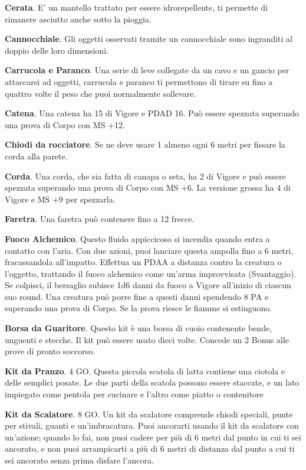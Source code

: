 \documentclass[12pt,a4paper,twoside,openany]{book}
\begin{document}
\begin{multicols}{2}
\textbf{Cerata}. E' un mantello trattato per essere idrorepellente, ti permette di rimanere asciutto anche sotto la pioggia.

\textbf{Cannocchiale}. Gli oggetti osservati tramite un cannocchiale sono ingranditi al doppio delle loro dimensioni.

\textbf{Carrucola e Paranco}. Una serie di leve collegate da un cavo e un gancio per attaccarsi ad oggetti, carrucola e paranco ti permettono di tirare su fino a quattro volte il
peso che puoi normalmente sollevare.

\textbf{Catena}. Una catena ha 15 di Vigore e PDAD 16. Può essere spezzata superando una prova di Corpo con MS +12.

\textbf{Chiodi da rocciatore}. Se ne deve usare 1 almeno ogni 6 metri per fissare la corda alla parete.

\textbf{Corda}. Una corda, che sia fatta di canapa o seta, ha 2 di Vigore e può essere spezzata superando una prova di Corpo con MS +6. La versione grossa ha 4 di Vigore e MS +9 per spezzarla.

\textbf{Faretra}. Una faretra può contenere fino a 12 frecce.

\textbf{Fuoco Alchemico}. Questo fluido appiccicoso si incendia quando entra a contatto con l’aria. Con due azioni, puoi lanciare questa ampolla fino a 6 metri, fracassandola all’impatto. Effettua un PDAA a distanza contro la creatura o l’oggetto, trattando il fuoco alchemico come un’arma improvvisata (Svantaggio). Se colpisci, il bersaglio subisce 1d6 danni da fuoco a Vigore all’inizio di ciascun suo round. Una creatura può porre fine a questi danni spendendo 8 PA e superando una prova di Corpo. Se la prova riesce le fiamme si estinguono.

\textbf{Borsa da Guaritore}. Questo kit è una borsa di cuoio contenente bende, unguenti e stecche. Il kit può essere usato dieci volte. Concede un 2 Bonus alle prove di pronto soccorso.

\textbf{Kit da Pranzo}. 4 GO. Questa piccola scatola di latta contiene una ciotola e delle semplici posate. Le due parti della scatola possono essere staccate, e un lato impiegato come pentola per cucinare e l’altro come piatto o contenitore

\textbf{Kit da Scalatore}. 8 GO. Un kit da scalatore comprende chiodi speciali, punte per stivali, guanti e un’imbracatura. Puoi ancorarti usando il kit da scalatore con un’azione; quando lo fai, non puoi cadere per più di 6 metri dal punto in cui ti sei ancorato, e non puoi arrampicarti a più di 6 metri di distanza dal punto a cui ti sei ancorato senza prima disfare l’ancora.


\end{multicols}
\end{document}
